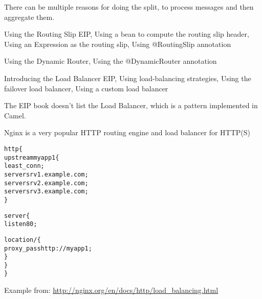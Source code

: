 \documentclass[Screen16to9,17pt]{foils}
\begin{document}


There can be multiple reasons for doing the split, to process messages and then aggregate them.



\begin{list2}
\item Using the Routing Slip EIP, Using a bean to compute the
routing slip header, Using an Expression as the routing
slip, Using @RoutingSlip annotation
\end{list2}

\begin{list2}
\item Using the Dynamic Router, Using the @DynamicRouter
 annotation
\end{list2}




\begin{list2}
\item Introducing the Load Balancer EIP, Using load-­balancing
strategies, Using the failover load balancer, Using a
custom load balancer
\item The EIP book doesn’t list the Load Balancer, which is a pattern implemented in Camel.
\item Nginx is a very popular HTTP routing engine and load balancer for HTTP(S)
\end{list2}



\begin{alltt}\footnotesize
  http \{
      upstream myapp1 \{
          least_conn;
          server srv1.example.com;
          server srv2.example.com;
          server srv3.example.com;
      \}

      server \{
          listen 80;

          location / \{
              proxy_pass http://myapp1;
          \}
      \}
  \}
\end{alltt}

Example from:
\url{http://nginx.org/en/docs/http/load_balancing.html}

\slidenext
\end{document}
